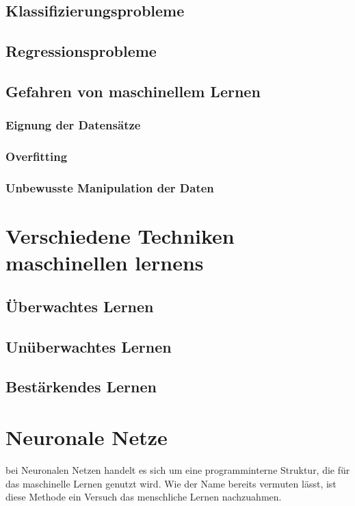 \documentclass{article}
\begin{document}
\subsection{Klassifizierungsprobleme}
\subsection{Regressionsprobleme}
\subsection{Gefahren von maschinellem Lernen}
\subsubsection{Eignung der Datensätze}
\subsubsection{Overfitting}
\subsubsection{Unbewusste Manipulation der Daten}
\section{Verschiedene Techniken maschinellen lernens}
\subsection{Überwachtes Lernen}
\subsection{Unüberwachtes Lernen}
\subsection{Bestärkendes Lernen}
\section{Neuronale Netze}
bei Neuronalen Netzen handelt es sich um eine programminterne Struktur, die für das maschinelle Lernen genutzt wird. Wie der Name bereits vermuten lässt, ist diese Methode ein Versuch das menschliche Lernen nachzuahmen.
\end{document}
